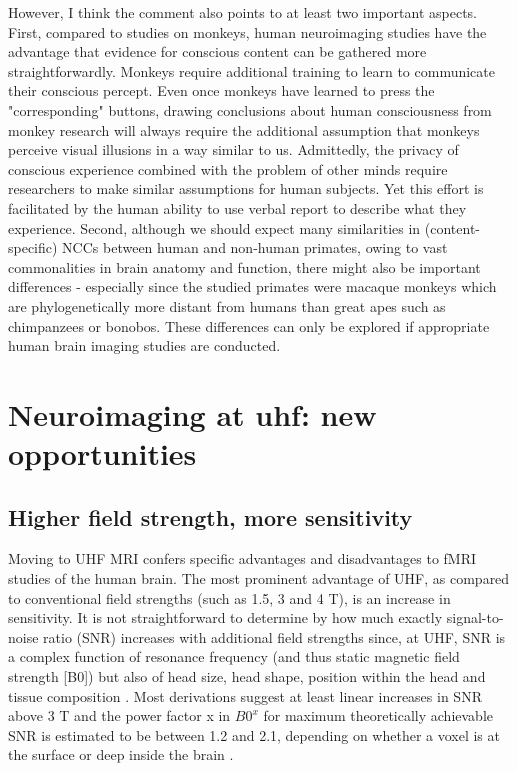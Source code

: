 However, I think the comment also points to at least two important aspects. First, compared to studies on monkeys, human neuroimaging studies have the advantage that evidence for conscious content can be gathered more straightforwardly. Monkeys require additional training to learn to communicate their conscious percept. Even once monkeys have learned to press the "corresponding" buttons, drawing conclusions about human consciousness from monkey research will always require the additional assumption that monkeys perceive visual illusions in a way similar to us. Admittedly, the privacy of conscious experience combined with the problem of other minds require researchers to make similar assumptions for human subjects. Yet this effort is facilitated by the human ability to use verbal report to describe what they experience. Second, although we should expect many similarities in (content-specific) NCCs between human and non-human primates, owing to vast commonalities in brain anatomy and function, there might also be important differences - especially since the studied primates were macaque monkeys which are phylogenetically more distant from humans than great apes such as chimpanzees or bonobos. These differences can only be explored if appropriate human brain imaging studies are conducted.

\section{Neuroimaging at uhf: new opportunities}
\subsection{Higher field strength, more sensitivity}
Moving to UHF MRI confers specific advantages and disadvantages to fMRI studies of the human brain. The most prominent advantage of UHF, as compared to conventional field strengths (such as 1.5, 3 and 4 T), is an increase in sensitivity. It is not straightforward to determine by how much exactly signal-to-noise ratio (SNR) increases with additional field strengths since, at UHF, SNR is a complex function of resonance frequency (and thus static magnetic field strength [B0]) but also of head size, head shape, position within the head and tissue composition \parencite{Ugurbil2003}. Most derivations suggest at least linear increases in SNR above 3 T \parencite{Ladd2018} and the power factor x in $B0^x$ for maximum theoretically achievable SNR is estimated to be between 1.2 and 2.1, depending on whether a voxel is at the surface or deep inside the brain \parencite{Ladd2018}.

